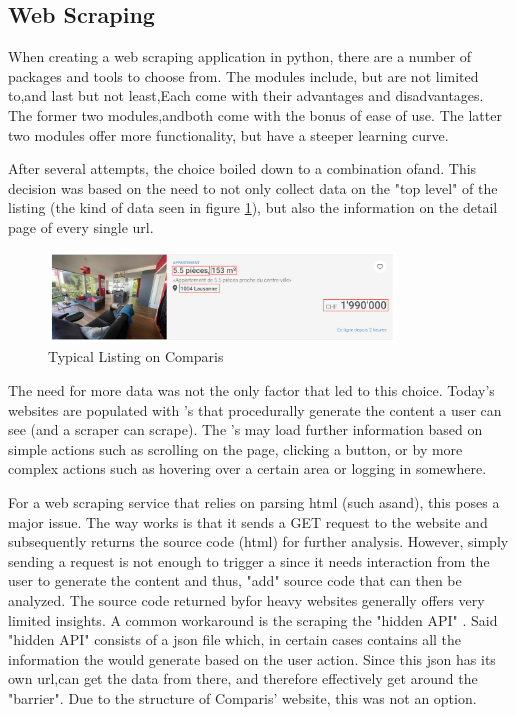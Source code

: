 \documentclass[main]{subfiles}
\begin{document}
\subsection{Web Scraping}

When creating a web scraping application in python, there are a number of packages and tools to choose from.
The modules include, but are not limited to\pkg[requests,]
\pkg[BeautifulSoup],\pkg[Scrapy]and last but not least,\pkg[Selenium.]
Each come with their advantages and disadvantages. 
The former two modules,\pkg[requests] and\pkg[BeautifulSoup] both come with the bonus of ease of use.
The latter two modules offer more functionality, but have a steeper learning curve.

After several attempts, the choice boiled down to a combination of\pkg[Selenium] and\pkg[Scrapy].
This decision was based on the need to not only collect data on the "top level" of the listing
(the kind of data seen in figure \ref{fig:listing}), 
but also the information on the detail page of every single \acs*{url}.

\begin{figure}[htbp]
    \centerline{
        \includegraphics[width = 92mm]{prog_1.png}}
    \caption{Typical Listing on Comparis}
    \label{fig:listing}
\end{figure}

The need for more data was not the only factor that led to this choice.
Today's websites are populated with \js's that procedurally generate the content a user can see (and a scraper can scrape).
The \js's may load further information based on simple actions such as scrolling on the page,
clicking a button, or by more complex actions such as hovering over a certain area or logging in somewhere.

For a web scraping service that relies on parsing \acs*{html} (such as\pkg[requests] and\pkg[BeautifulSoup]), 
this poses a major issue.
The way\pkg[requests]\hspace{-5pt} works is that it sends a GET request to the website and subsequently returns the source code (\acs*{html}) for further analysis.
However, simply sending a request is not enough to trigger a \js since it needs interaction from the user to generate the content and thus, 
"add" source code that can then be analyzed.
The source code returned by\pkg[requests] for \js heavy websites generally offers very limited insights.
A common workaround is the scraping the "hidden API" \cite{eWebScrapingBeginners2019}  \cite{johnwatsonrooneyAlwaysCheckHidden2021}.
Said "hidden API" consists of a \acs*{json} file which, in certain cases contains all the information the \js would generate based on the user action.
Since this  \acs*{json} has its own \acs*{url},\pkg[requests] \hspace{-3pt}can get the data from there, 
and therefore effectively get around the "\js barrier".
Due to the structure of Comparis' website, this was not an option.
\end{document}
